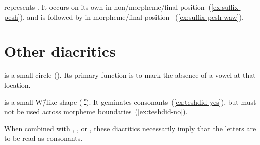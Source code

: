  represents .
It occurs on its own in non\-/morpheme\-/final position~(\vref{ex:suffix-pesh}),
and is followed by  in morpheme\-/final position~%
(\vref{ex:suffix-pesh-waw}).

\pex
  \a\label{ex:suffix-pesh}%
  \a\label{ex:suffix-pesh-waw}%
\xe

\section{Other diacritics}

  is a small circle ().
Its primary function is to mark the absence of a vowel at that location.

\ex
\xe

  is a small W\=/like shape (\arabtxt
{ـّ}).
It geminates consonants~(\vref{ex:teshdid-yes}), but must not be used across
morpheme boundaries~(\vref{ex:teshdid-no}).

\pex
  \a\label{ex:teshdid-yes}%
  \a\label{ex:teshdid-no}%
\xe

When combined with , , or
, these diacritics necessarily imply that the letters are
to be read as consonants.

\ex
\xe
